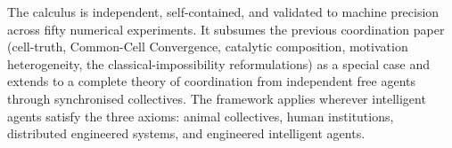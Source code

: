 \documentclass[11pt,twocolumn,a4paper]{article}
\begin{document}
The calculus is independent, self-contained, and validated to
machine precision across fifty numerical experiments. It subsumes the
previous coordination paper (cell-truth, Common-Cell Convergence,
catalytic composition, motivation heterogeneity, the
classical-impossibility reformulations) as a special case and
extends to a complete theory of coordination from independent free
agents through synchronised collectives. The framework applies wherever
intelligent agents satisfy the three axioms: animal collectives,
human institutions, distributed engineered systems, and engineered
intelligent agents.



\end{document}
